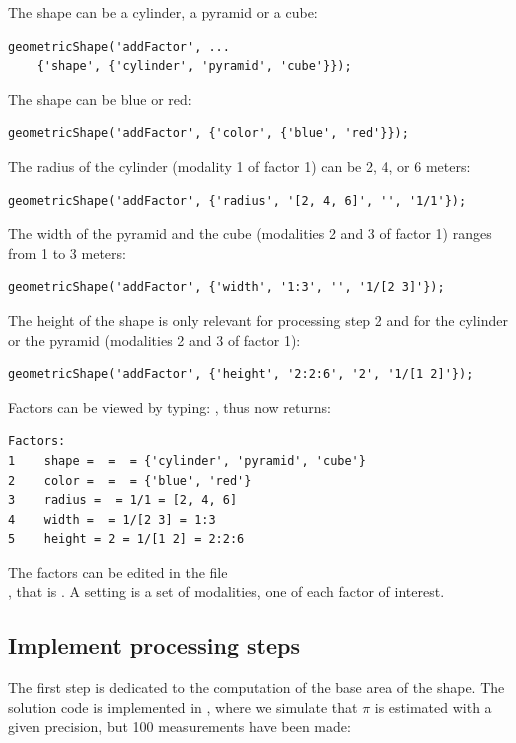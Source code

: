 \documentclass[a4paper,fleqn]{tufte-handout}
\begin{document}
The shape can be a cylinder, a pyramid or a cube:
\begin{lstlisting}
geometricShape('addFactor', ...
	{'shape', {'cylinder', 'pyramid', 'cube'}});
\end{lstlisting}
The shape can be blue or red:
\begin{lstlisting}
geometricShape('addFactor', {'color', {'blue', 'red'}});
\end{lstlisting}
The radius of the cylinder (modality 1 of factor 1) can be 2, 4, or 6 meters:
\begin{lstlisting}
geometricShape('addFactor', {'radius', '[2, 4, 6]', '', '1/1'});
\end{lstlisting}
The width of the pyramid and the cube (modalities 2 and 3 of factor 1) ranges from 1 to 3 meters:
\begin{lstlisting}
geometricShape('addFactor', {'width', '1:3', '', '1/[2 3]'});
\end{lstlisting}
The height of the shape is only relevant for processing step 2 and for the cylinder or the pyramid (modalities 2 and 3 of factor 1):
\begin{lstlisting}
geometricShape('addFactor', {'height', '2:2:6', '2', '1/[1 2]'});
\end{lstlisting}


Factors can be viewed by typing: , thus  now returns:
\begin{lstlisting}
Factors:
1    shape =  =  = {'cylinder', 'pyramid', 'cube'}
2    color =  =  = {'blue', 'red'}
3    radius =  = 1/1 = [2, 4, 6]
4    width =  = 1/[2 3] = 1:3
5    height = 2 = 1/[1 2] = 2:2:6
\end{lstlisting}
The factors can be edited in the file \\ , that is . A setting is a set of modalities, one of each factor of interest.

\subsection{Implement processing steps}

The first step is dedicated to the computation of the base area of the shape. The solution code is implemented in , where we simulate that $\pi$ is estimated with a given precision, but 100 measurements have been made:

\end{document}
